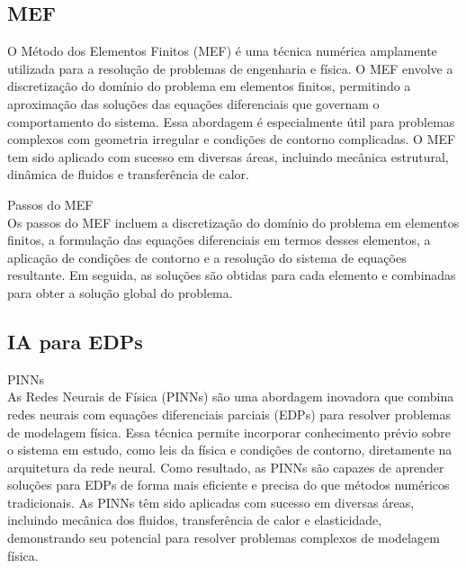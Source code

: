 \subsection{MEF}
O Método dos Elementos Finitos (MEF) é uma técnica numérica amplamente utilizada para a resolução de problemas de engenharia e física. O MEF envolve a discretização do domínio do problema em elementos finitos, permitindo a aproximação das soluções das equações diferenciais que governam o comportamento do sistema. Essa abordagem é especialmente útil para problemas complexos com geometria irregular e condições de contorno complicadas. O MEF tem sido aplicado com sucesso em diversas áreas, incluindo mecânica estrutural, dinâmica de fluidos e transferência de calor.

{Passos do MEF}\\ 
Os passos do MEF incluem a discretização do domínio do problema em elementos finitos, a formulação das equações diferenciais em termos desses elementos, a aplicação de condições de contorno e a resolução do sistema de equações resultante. Em seguida, as soluções são obtidas para cada elemento e combinadas para obter a solução global do problema.

\subsection{IA para EDPs}

{PINNs}\\
As Redes Neurais de Física (PINNs) são uma abordagem inovadora que combina redes neurais com equações diferenciais parciais (EDPs) para resolver problemas de modelagem física. Essa técnica permite incorporar conhecimento prévio sobre o sistema em estudo, como leis da física e condições de contorno, diretamente na arquitetura da rede neural. Como resultado, as PINNs são capazes de aprender soluções para EDPs de forma mais eficiente e precisa do que métodos numéricos tradicionais. As PINNs têm sido aplicadas com sucesso em diversas áreas, incluindo mecânica dos fluidos, transferência de calor e elasticidade, demonstrando seu potencial para resolver problemas complexos de modelagem física.


